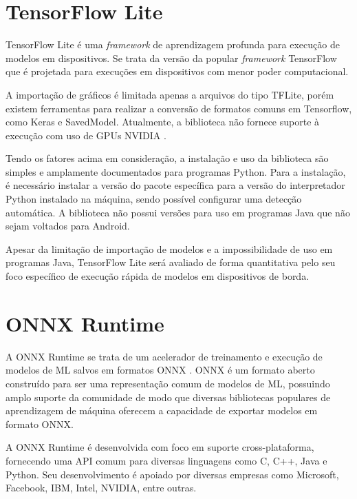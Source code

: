 \section{TensorFlow Lite}
\label{tensorflow-lite}

TensorFlow Lite \cite{ml_site_tensorflow_lite} é uma \textit{framework} de aprendizagem profunda para execução de modelos em dispositivos. Se trata da versão da popular \textit{framework} TensorFlow que é projetada para execuções em dispositivos com menor poder computacional.

A importação de gráficos é limitada apenas a arquivos do tipo TFLite, porém existem ferramentas para realizar a conversão de formatos comuns em Tensorflow, como Keras e SavedModel. Atualmente, a biblioteca não fornece suporte à execução com uso de GPUs NVIDIA \cite{ml_site_tensorflow_lite_gpus}.

Tendo os fatores acima em consideração, a instalação e uso da biblioteca são simples e amplamente documentados para programas Python. Para a instalação, é necessário instalar a versão do pacote específica para a versão do interpretador Python instalado na máquina, sendo possível configurar uma detecção automática. A biblioteca não possui versões para uso em programas Java que não sejam voltados para Android.

Apesar da limitação de importação de modelos e a impossibilidade de uso em programas Java, TensorFlow Lite será avaliado de forma quantitativa pelo seu foco específico de execução rápida de modelos em dispositivos de borda.

\section{ONNX Runtime}

A ONNX Runtime \cite{ml_site_onnx_runtime} se trata de um acelerador de treinamento e execução de modelos de ML salvos em formatos ONNX \cite{ml_site_onnx}. \acrfull{ONNX} é um formato aberto construído para ser uma representação comum de modelos de ML, possuindo amplo suporte da comunidade de modo que diversas bibliotecas populares de aprendizagem de máquina oferecem a capacidade de exportar modelos em formato ONNX.

A ONNX Runtime é desenvolvida com foco em suporte cross-plataforma, fornecendo uma \acrshort{API} comum para diversas linguagens como C, C++, Java e Python. Seu desenvolvimento é apoiado por diversas empresas como Microsoft, Facebook, IBM, Intel, NVIDIA, entre outras.


